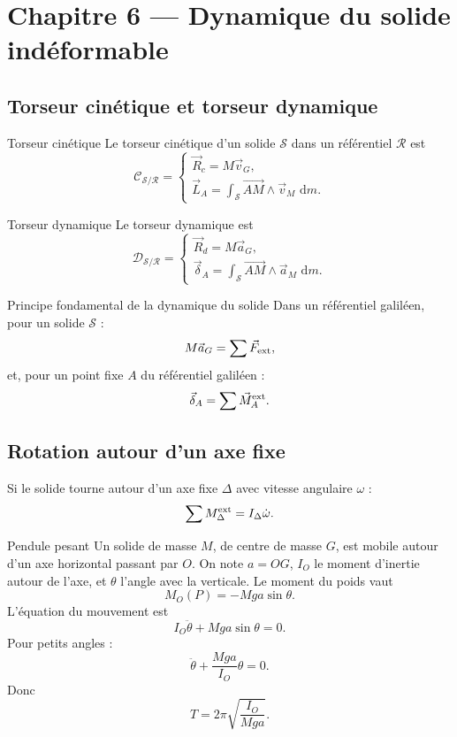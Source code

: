 \documentclass[11pt,a4paper]{article}
\newcommand{\vect}[1]{\overrightarrow{#1}}
\newcommand{\dd}{\,\mathrm{d}}
\newcommand{\Rep}{\mathcal R}
\newcommand{\Solide}{\mathcal S}
\begin{document}
\section{Chapitre 6 — Dynamique du solide indéformable}

\subsection{Torseur cinétique et torseur dynamique}

\begin{definitionbox}{Torseur cinétique}{}
Le torseur cinétique d'un solide $\Solide$ dans un référentiel $\Rep$ est
\[
\mathcal C_{\Solide/\Rep}
=
\left\{
\begin{array}{l}
\vec R_c=M\vec v_G,\\
\vec L_A=\displaystyle\int_{\Solide}\vect{AM}\wedge\vec v_M\,\dd m.
\end{array}
\right.
\]
\end{definitionbox}

\begin{definitionbox}{Torseur dynamique}{}
Le torseur dynamique est
\[
\mathcal D_{\Solide/\Rep}
=
\left\{
\begin{array}{l}
\vec R_d=M\vec a_G,\\
\vec \delta_A=\displaystyle\int_{\Solide}\vect{AM}\wedge\vec a_M\,\dd m.
\end{array}
\right.
\]
\end{definitionbox}

\begin{theoremBox}{Principe fondamental de la dynamique du solide}{}
Dans un référentiel galiléen, pour un solide $\Solide$ :
\[
M\vec a_G=\sum \vec F_{\rm ext},
\]
et, pour un point fixe $A$ du référentiel galiléen :
\[
\vec \delta_A=\sum \vec M_A^{\rm ext}.
\]
\end{theoremBox}

\subsection{Rotation autour d'un axe fixe}

Si le solide tourne autour d'un axe fixe $\Delta$ avec vitesse angulaire $\omega$ :
\[
\sum M_\Delta^{\rm ext}=I_\Delta\dot\omega.
\]

\begin{examplebox}{Pendule pesant}{}
Un solide de masse $M$, de centre de masse $G$, est mobile autour d'un axe horizontal passant par $O$.
On note $a=OG$, $I_O$ le moment d'inertie autour de l'axe, et $\theta$ l'angle avec la verticale.
Le moment du poids vaut
\[
M_O(P)=-Mga\sin\theta.
\]
L'équation du mouvement est
\[
I_O\ddot\theta+Mga\sin\theta=0.
\]
Pour petits angles :
\[
\ddot\theta+\frac{Mga}{I_O}\theta=0.
\]
Donc
\[
T=2\pi\sqrt{\frac{I_O}{Mga}}.
\]
\end{examplebox}
\end{document}
